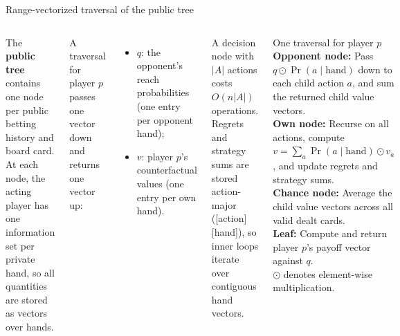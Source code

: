 \documentclass[10pt,aspectratio=169]{beamer}
\begin{document}
\begin{frame}{Range-vectorized traversal of the public tree}
\begin{columns}[T]
\small
The \textbf{public tree} contains one node per public betting history and board card. At each node, the acting player has one
information set per private hand, so all quantities are stored as vectors over hands.

\pause
\medskip
A traversal for player $p$ passes one vector down and returns one vector up:
\begin{itemize}\setlength\itemsep{1pt}
\item $q$: the opponent's reach probabilities (one entry per opponent hand);
\item $v$: player $p$'s counterfactual values (one entry per own hand).
\end{itemize}
A decision node with $|A|$ actions costs $O(n|A|)$ operations. \pause Regrets and strategy sums are stored action-major
([action][hand]), so inner loops iterate over contiguous hand vectors.
\pause
\begin{block}{One traversal for player $p$}
\footnotesize
\textbf{Opponent node:} Pass $q \odot \Pr(a \mid \text{hand})$ down to each child action $a$, and sum the returned child value vectors.\\[3pt]
\pause \textbf{Own node:} Recurse on all actions, compute $v = \sum_a \Pr(a \mid \text{hand}) \odot v_a$, and update regrets and strategy sums.\\[3pt]
\pause \textbf{Chance node:} Average the child value vectors across all valid dealt cards.\\[3pt]
\pause \textbf{Leaf:} Compute and return player $p$'s payoff vector against $q$.\\[2pt]
{\footnotesize $\odot$ denotes element-wise multiplication.}
\end{block}
\end{columns}
\end{frame}
\end{document}

